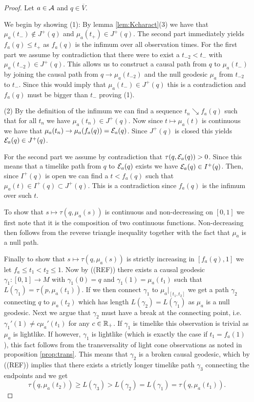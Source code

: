 \begin{proof}
Let $a\in \mathcal{A}$ and $q\in \overline{V}$.

We begin by showing (1): By lemma \ref{lem:Kcharact}(3) we have that
$\mu_a(t_-)\notin J^+(q)$ and $\mu_a(t_+)\in J^+(q)$. The second part immediately yields $f_a(q) \leq t_+$ as $f_a(q)$ is the infimum over all observation times. For the first part we assume by contradiction that there were to exist a $t_{-2}<t_-$ with $\mu_a(t_{-2})\in J^+(q)$. This allows us to construct a causal path from $q$ to $\mu_a(t_-)$ by joining the causal path from $q\to \mu_a(t_{-2})$ and the null geodesic $\mu_a$ from $t_{-2}$ to $t_-$. Since this would imply that $\mu_a(t_-)\in J^+(q)$ this is a contradiction and $f_a(q)$ must be bigger than $t_-$ proving (1).

(2)
By the definition of the infimum we can find a sequence $t_n\searrow f_a(q)$ such that for all $t_n$ we have $\mu_a(t_n)\in J^+(q)$. Now since $t\mapsto \mu_a(t)$ is continuous we have that $\mu_a(t_n)\to \mu_a(f_a(q)) = \mathcal{E}_a(q)$. Since $J^+(q)$ is closed this yields $\mathcal{E}_a(q)\in J^+(q)$. 

For the second part we assume by contradiction that $\tau(q,\mathcal{E}_a(q)) > 0$. Since this means that a timelike path from $q$ to $\mathcal{E}_a(q)$ exists we have $\mathcal{E}_a(q)\in I^+(q)$. Then, since $I^+(q)$ is open we can find a $t<f_a(q)$ such that $\mu_a(t)\in I^+(q) \subset J^+(q)$. This is a contradiction since $f_a(q)$ is the infimum over such $t$.

To show that $s\mapsto \tau(q,\mu_a(s))$ is continuous and non-decreasing on $[0,1]$ we first note that it is the composition of two continuous functions. Non-decreasing then follows from the reverse triangle inequality together with the fact that $\mu_a$ is a null path.

Finally to show that $s\mapsto \tau(q,\mu_a(s))$ is strictly increasing in $[f_a(q),1]$ we let $f_a\leq t_1<t_2\leq 1$. Now by ((REF)) there exists a causal geodesic $\gamma_1:[0,1]\to M$ with $\gamma_1(0)=q$ and $\gamma_1(1)=\mu_a(t_1)$ such that $L(\gamma_1)=\tau(p,\mu_a(t_1))$. 
If we then connect $\gamma_1$ to $\mu_a\rvert_{[t_1,t_2]}$ we get a path $\gamma_2$ connecting $q$ to $\mu_a(t_2)$ which has length $L(\gamma_2) = L(\gamma_1)$ as $\mu_a$ is a null geodesic. Next we argue that $\gamma_2$ must have a break at the connecting point, i.e. $\gamma_1'(1) \neq c\mu_a'(t_1)$ for any $c\in \mathbb{R}_+$. If $\gamma_1$ is timelike this observation is trivial as $\mu_a$ is lightlike. If however, $\gamma_1$ is lightlike (which is exactly the case if $t_1=f_a(1)$), this fact follows from the transversality of light cone observations as noted in proposition \ref{prop:trans}. This means that $\gamma_2$ is a broken causal geodesic, which by ((REF)) implies that there exists a strictly longer timelike path $\gamma_3$ connecting the endpoints and we get
\[
\tau(q,\mu_a(t_2)) \geq L(\gamma_3) > L(\gamma_2) = L(\gamma_1) = \tau(q,\mu_a(t_1)).
\]


\end{proof}
